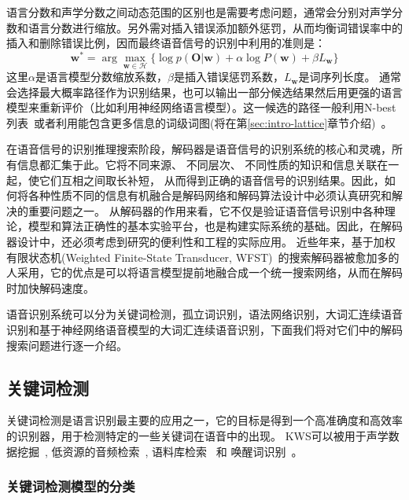 语言分数和声学分数之间动态范围的区别也是需要考虑问题，通常会分别对声学分数和语言分数进行缩放。另外需对插入错误添加额外惩罚，从而均衡词错误率中的插入和删除错误比例，因而最终语音信号的识别中利用的准则是：
\begin{equation}
\mathbf{w}^* = \arg \max_{\mathbf{w} \in \mathcal{H}} \{\log p(\mathbf{O}|\mathbf{w}) + \alpha \log P(\mathbf{w}) + \beta L_{\mathbf{w}}\}
\end{equation}
这里$\alpha$是语言模型分数缩放系数，$\beta$是插入错误惩罚系数，$L_{\mathbf{w}}$是词序列长度。
通常会选择最大概率路径作为识别结果，也可以输出一部分候选结果然后用更强的语言模型来重新评价（比如利用神经网络语言模型）。这一候选的路径一般利用N-best列表~\cite{schwartz1990n}或者利用能包含更多信息的词级词图(将在第\ref{sec:intro-lattice}章节介绍)~\cite{ortmanns1997word}。

在语音信号的识别推理搜索阶段，解码器是语音信号的识别系统的核心和灵魂，所有信息都汇集于此。它将不同来源、 不同层次、 不同性质的知识和信息关联在一起，使它们互相之间取长补短， 从而得到正确的语音信号的识别结果。因此，如何将各种性质不同的信息有机融合是解码网络和解码算法设计中必须认真研究和解决的重要问题之一。
从解码器的作用来看，它不仅是验证语音信号识别中各种理论，模型和算法正确性的基本实验平台，也是构建实际系统的基础。因此，在解码器设计中，还必须考虑到研究的便利性和工程的实际应用。
近些年来，基于加权有限状态机(Weighted Finite-State Transducer, WFST)~\cite{mohri2002weighted}的搜索解码器被愈加多的人采用，它的优点是可以将语言模型提前地融合成一个统一搜索网络，从而在解码时加快解码速度。

语音识别系统可以分为关键词检测，孤立词识别，语法网络识别，大词汇连续语音识别和基于神经网络语音模型的大词汇连续语音识别，下面我们将对它们中的解码搜索问题进行逐一介绍。

\subsection{关键词检测}
\label{chap:intro-kws-dec}

关键词检测是语言识别最主要的应用之一，它的目标是得到一个高准确度和高效率的识别器，用于检测特定的一些关键词在语音中的出现。
KWS可以被用于声学数据挖掘~\cite{zhou2005data}, 低资源的音频检索~\cite{shen2009comparison}, 
语料库检索~\cite{garofolo2000trec} 和 唤醒词识别~\cite{chen2014small}。

\subsubsection{关键词检测模型的分类}
\label{chap:intro-kws-class}

